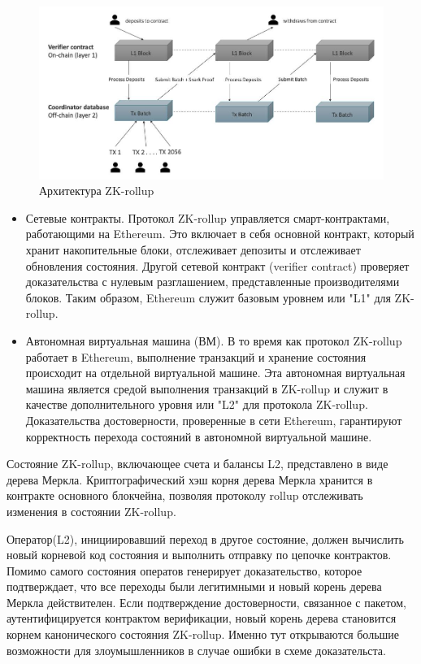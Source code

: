 \documentclass[a4paper]{article}
\begin{document}
\begin{figure}[ht!]
\includegraphics[width=180mm]{Layer-2-architecture.jpg}
\caption{Архитектура ZK-rollup}
\label{ZK-rollup}
\end{figure}

\begin{itemize}
\item Сетевые контракты. Протокол ZK-rollup управляется смарт-контрактами, работающими на Ethereum. Это включает в себя основной контракт, который хранит накопительные блоки, отслеживает депозиты и отслеживает обновления состояния. Другой сетевой контракт (verifier contract) проверяет доказательства с нулевым разглашением, представленные производителями блоков. Таким образом, Ethereum служит базовым уровнем или "L1" для ZK-rollup.

\item Автономная виртуальная машина (ВМ). В то время как протокол ZK-rollup работает в Ethereum, выполнение транзакций и хранение состояния происходит на отдельной виртуальной машине. Эта автономная виртуальная машина является средой выполнения транзакций в ZK-rollup и служит в качестве дополнительного уровня или "L2" для протокола ZK-rollup. Доказательства достоверности, проверенные в сети Ethereum, гарантируют корректность перехода состояний в автономной виртуальной машине.
\end{itemize}

Состояние ZK-rollup, включающее счета и балансы L2, представлено в виде дерева Меркла. Криптографический хэш корня дерева Меркла хранится в контракте основного блокчейна, позволяя протоколу rollup отслеживать изменения в состоянии ZK-rollup.

Оператор(L2), инициировавший переход в другое состояние, должен вычислить новый корневой код состояния и выполнить отправку по цепочке контрактов. Помимо самого состояния оператов генерирует доказательство, которое подтверждает, что все переходы были легитимными и новый корень дерева Меркла действителен. Если подтверждение достоверности, связанное с пакетом, аутентифицируется контрактом верификации, новый корень дерева становится корнем канонического состояния ZK-rollup. Именно тут открываются большие возможности для злоумышленников в случае ошибки в схеме доказательста.
\end{document}
